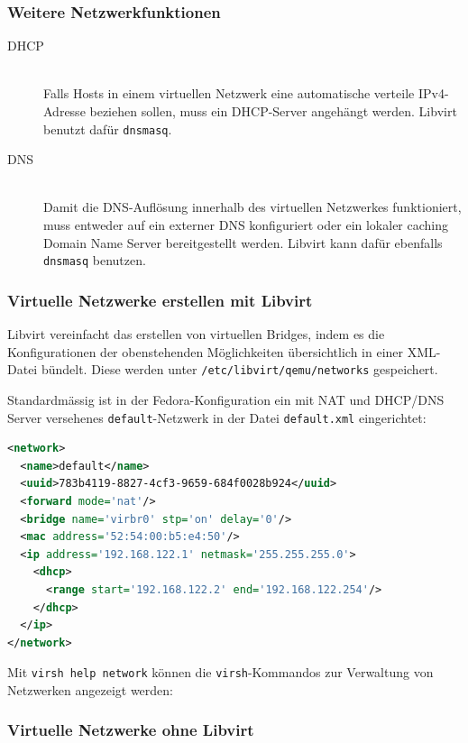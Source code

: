 \subsubsection{Weitere Netzwerkfunktionen}
\begin{description}
	\item[DHCP] \hfill \\
		Falls Hosts in einem virtuellen Netzwerk eine automatische verteile IPv4-Adresse beziehen sollen, muss ein DHCP-Server angehängt werden. Libvirt benutzt dafür \lstinline|dnsmasq|.
	\item[DNS] \hfill \\
		Damit die DNS-Auflösung innerhalb des virtuellen Netzwerkes funktioniert, muss entweder auf ein externer DNS konfiguriert oder ein lokaler caching Domain Name Server bereitgestellt werden. Libvirt kann dafür ebenfalls \lstinline|dnsmasq| benutzen.
\end{description}

\subsubsection{Virtuelle Netzwerke erstellen mit Libvirt}
Libvirt vereinfacht das erstellen von virtuellen Bridges, indem es die Konfigurationen der obenstehenden Möglichkeiten übersichtlich in einer XML-Datei bündelt. Diese werden unter \lstinline|/etc/libvirt/qemu/networks| gespeichert.

Standardmässig ist in der Fedora-Konfiguration ein mit NAT und DHCP/DNS Server versehenes \lstinline|default|-Netzwerk in der Datei \lstinline|default.xml| eingerichtet:

\begin{lstlisting}[language=xml]
<network>
  <name>default</name>
  <uuid>783b4119-8827-4cf3-9659-684f0028b924</uuid>
  <forward mode='nat'/>
  <bridge name='virbr0' stp='on' delay='0'/>
  <mac address='52:54:00:b5:e4:50'/>
  <ip address='192.168.122.1' netmask='255.255.255.0'>
    <dhcp>
      <range start='192.168.122.2' end='192.168.122.254'/>
    </dhcp>
  </ip>
</network>
\end{lstlisting}

Mit \lstinline|virsh help network| können die \lstinline|virsh|-Kommandos zur Verwaltung von Netzwerken angezeigt werden:





\subsubsection{Virtuelle Netzwerke ohne Libvirt}


